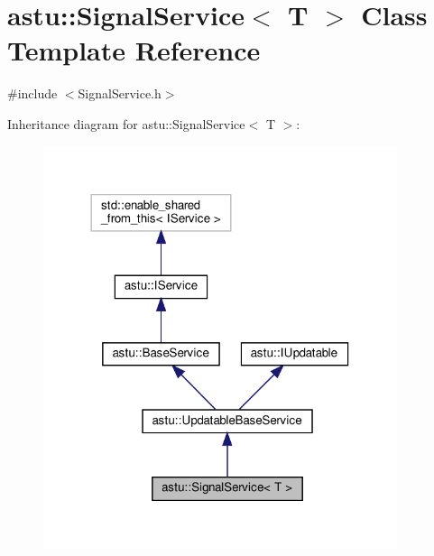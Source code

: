 \hypertarget{classastu_1_1SignalService}{}\section{astu\+:\+:Signal\+Service$<$ T $>$ Class Template Reference}
\label{classastu_1_1SignalService}


{\ttfamily \#include $<$Signal\+Service.\+h$>$}



Inheritance diagram for astu\+:\+:Signal\+Service$<$ T $>$\+:\nopagebreak
\begin{figure}[H]
\begin{center}
\leavevmode
\includegraphics[width=294pt]{classastu_1_1SignalService__inherit__graph}
\end{center}
\end{figure}


